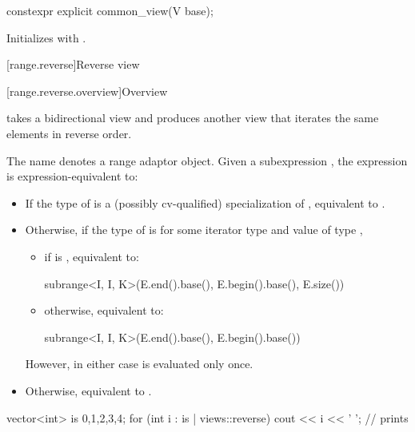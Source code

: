 %
\begin{itemdecl}
constexpr explicit common_view(V base);
\end{itemdecl}

\begin{itemdescr}
\pnum
\effects
Initializes  with .
\end{itemdescr}

[range.reverse]{Reverse view}

[range.reverse.overview]{Overview}

\pnum
{} takes a bidirectional view and produces
another view that iterates the same elements in reverse order.

\pnum
{}%
The name  denotes a
range adaptor object.
Given a subexpression , the expression
 is expression-equivalent to:
\begin{itemize}
\item
  If the type of  is
  a (possibly cv-qualified) specialization of ,
  equivalent to .
\item
  Otherwise, if the type of  is \cv{} 
  for some iterator type  and
  value  of type ,
  \begin{itemize}
  \item
    if  is , equivalent to:
\begin{codeblock}
subrange<I, I, K>(E.end().base(), E.begin().base(), E.size())
\end{codeblock}
  \item
    otherwise, equivalent to:
\begin{codeblock}
subrange<I, I, K>(E.end().base(), E.begin().base())
\end{codeblock}
  \end{itemize}
  However, in either case  is evaluated only once.
\item
  Otherwise, equivalent to .
\end{itemize}

\pnum
\begin{example}
\begin{codeblock}
vector<int> is {0,1,2,3,4};
for (int i : is | views::reverse)
  cout << i << ' '; // prints 
\end{codeblock}
\end{example}

